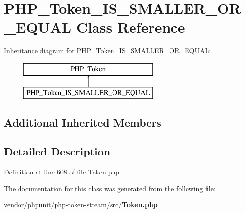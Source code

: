 \section{P\+H\+P\+\_\+\+Token\+\_\+\+I\+S\+\_\+\+S\+M\+A\+L\+L\+E\+R\+\_\+\+O\+R\+\_\+\+E\+Q\+U\+A\+L Class Reference}
\label{class_p_h_p___token___i_s___s_m_a_l_l_e_r___o_r___e_q_u_a_l}
Inheritance diagram for P\+H\+P\+\_\+\+Token\+\_\+\+I\+S\+\_\+\+S\+M\+A\+L\+L\+E\+R\+\_\+\+O\+R\+\_\+\+E\+Q\+U\+A\+L\+:\begin{figure}[H]
\begin{center}
\leavevmode
\includegraphics[height=2.000000cm]{class_p_h_p___token___i_s___s_m_a_l_l_e_r___o_r___e_q_u_a_l}
\end{center}
\end{figure}
\subsection*{Additional Inherited Members}


\subsection{Detailed Description}


Definition at line 608 of file Token.\+php.



The documentation for this class was generated from the following file\+:\begin{DoxyCompactItemize}
\item 
vendor/phpunit/php-\/token-\/stream/src/{\bf Token.\+php}\end{DoxyCompactItemize}
